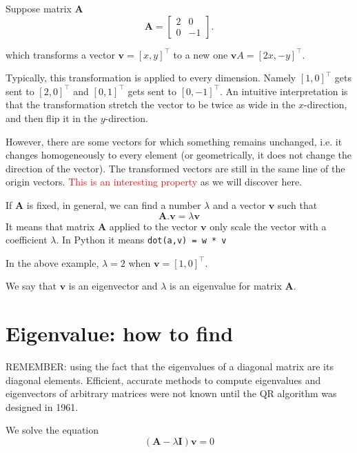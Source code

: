 Suppose matrix $\mathbf{A}$
\begin{equation}
\mathbf{A} = \begin{bmatrix}
2 & 0 \\
0 & -1
\end{bmatrix}.
\end{equation}

which transforms a vector $\mathbf{v} = [x, y]^\top$ to a new one $\mathbf{v}A =
[2x, -y]^\top$.

Typically, this transformation is applied to every dimension.
Namely $[1, 0]^\top$ gets sent to $[2, 0]^\top$ and $[0, 1]^\top$ gets sent to
$[0, -1]^\top$.  An intuitive interpretation is that the transformation stretch
the vector to be twice as wide in the $x$-direction, and then flip it in the
$y$-direction.


However, there are some vectors for which something remains unchanged, i.e. it
changes homogeneously to every element (or geometrically, it does not change the
direction of the vector). The transformed vectors are still in the same line of
the origin vectors. \textcolor{red}{This is an interesting property} as we will
discover here.


If  $\mathbf{A}$ is fixed, in general, we can find a number 
$\lambda$ and a vector 
$\mathbf{v}$  such that
\begin{equation}
\mathbf{A. v} = \lambda \mathbf{v}
\end{equation}
It means that matrix $\mathbf{A}$ applied to the vector $\mathbf{v}$ only scale the vector with a
coefficient $\lambda$. In Python it means \verb!dot(a,v) = w * v!

In the above example, $\lambda = 2$ when $\mathbf{v} = [1,0]^\top$.

We say that $\mathbf{v}$ is an eigenvector and $\lambda$ is an
eigenvalue for matrix $\mathbf{A}$.

\section{Eigenvalue: how to find}

REMEMBER: using the fact that the eigenvalues of a diagonal matrix are its
diagonal elements. 
Efficient, accurate methods to compute eigenvalues and eigenvectors of arbitrary
matrices were not known until the QR algorithm was designed in 1961.

We solve the equation
\begin{equation}
(\mathbf{A} - \lambda \mathbf{I})\mathbf{v} = 0
\end{equation}

